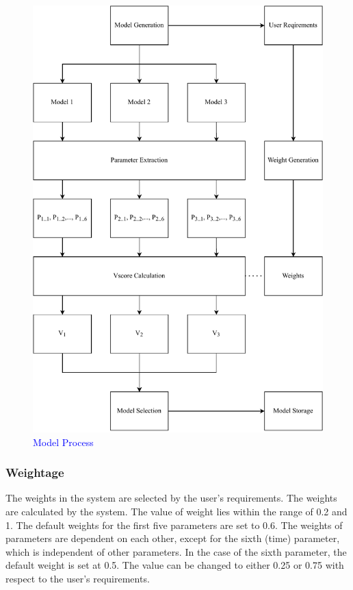\documentclass[a4paper,fleqn]{cas-dc}
\newcommand{\responsemodsm}[1]{\textcolor{blue}{#1}}
\newcommand{\captionb}[1]{\caption{\responsemodsm{#1}}}
\begin{document}
\begin{figure}[ht]
    \centering
    \includegraphics[width=1.6\columnwidth]{math_model_relaxed_flow.pdf}
    \captionb{Model Process}
    \label{fig:model_process}
\end{figure}

\subsubsection*{Weightage}\label{subsubsec:weightage}

The weights in the system are selected by the user's requirements. The weights are calculated by the system. The value of weight lies within the range of 0.2 and 1. The default weights for the first five parameters are set to 0.6. The weights of parameters are dependent on each other, except for the sixth (time) parameter, which is independent of other parameters. In the case of the sixth parameter, the default weight is set at 0.5. The value can be changed to either 0.25 or 0.75 with respect to the user's requirements.
\end{document}
